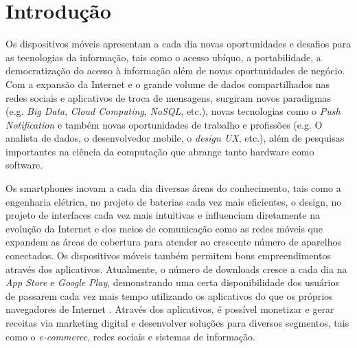 \section{Introdução}\label{sec:introducao}
Os dispositivos móveis apresentam a cada dia novas oportunidades e desafios para as tecnologias da informação, tais como o acesso ubíquo, a portabilidade, a democratização do acesso à informação além de novas oportunidades de negócio. Com a expansão da Internet e o grande volume de dados compartilhados nas redes sociais e aplicativos de troca de mensagens, surgiram novos paradigmas (e.g. \textit{Big Data}, \textit{Cloud Computing}, \textit{NoSQL}, etc.), novas tecnologias como o \textit{Push Notification} e também novas oportunidades de trabalho e profissões (e.g. O analista de dados, o desenvolvedor mobile, o \textit{design UX}, etc.), além de pesquisas importantes na ciência da computação que abrange tanto hardware como software.\par

Os smartphones inovam a cada dia diversas áreas do conhecimento, tais como a engenharia elétrica, no projeto de baterias cada vez mais eficientes, o design, no projeto de interfaces cada vez mais intuitivas e influenciam diretamente na evolução da Internet e dos meios de comunicação como as redes móveis que expandem as áreas de cobertura para atender ao crescente número de aparelhos conectados. Os dispositivos móveis também permitem bons empreendimentos através dos aplicativos. Atualmente, o número de downloads cresce a cada dia na \textit{App Store} e \textit{Google Play}, demonstrando uma certa disponibilidade dos usuários de passarem cada vez mais tempo utilizando os aplicativos do que os próprios navegadores de Internet \cite{D&T}. Através dos aplicativos, é possível monetizar e gerar receitas via marketing digital e desenvolver soluções para diversos segmentos, tais como o \textit{e-commerce}, redes sociais e sistemas de informação.\par


